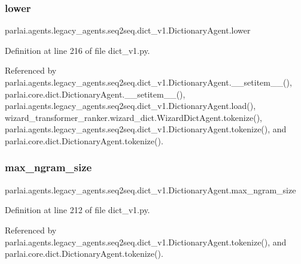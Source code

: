 \subsubsection{\texorpdfstring{lower}{lower}}
{\footnotesize\ttfamily parlai.\+agents.\+legacy\+\_\+agents.\+seq2seq.\+dict\+\_\+v1.\+Dictionary\+Agent.\+lower}



Definition at line 216 of file dict\+\_\+v1.\+py.



Referenced by parlai.\+agents.\+legacy\+\_\+agents.\+seq2seq.\+dict\+\_\+v1.\+Dictionary\+Agent.\+\_\+\+\_\+setitem\+\_\+\+\_\+(), parlai.\+core.\+dict.\+Dictionary\+Agent.\+\_\+\+\_\+setitem\+\_\+\+\_\+(), parlai.\+agents.\+legacy\+\_\+agents.\+seq2seq.\+dict\+\_\+v1.\+Dictionary\+Agent.\+load(), wizard\+\_\+transformer\+\_\+ranker.\+wizard\+\_\+dict.\+Wizard\+Dict\+Agent.\+tokenize(), parlai.\+agents.\+legacy\+\_\+agents.\+seq2seq.\+dict\+\_\+v1.\+Dictionary\+Agent.\+tokenize(), and parlai.\+core.\+dict.\+Dictionary\+Agent.\+tokenize().

\mbox{\label{classparlai_1_1agents_1_1legacy__agents_1_1seq2seq_1_1dict__v1_1_1DictionaryAgent_afe5b8a2a30a551be93b625eee5191f71}} 
\subsubsection{\texorpdfstring{max\+\_\+ngram\+\_\+size}{max\_ngram\_size}}
{\footnotesize\ttfamily parlai.\+agents.\+legacy\+\_\+agents.\+seq2seq.\+dict\+\_\+v1.\+Dictionary\+Agent.\+max\+\_\+ngram\+\_\+size}



Definition at line 212 of file dict\+\_\+v1.\+py.



Referenced by parlai.\+agents.\+legacy\+\_\+agents.\+seq2seq.\+dict\+\_\+v1.\+Dictionary\+Agent.\+tokenize(), and parlai.\+core.\+dict.\+Dictionary\+Agent.\+tokenize().

